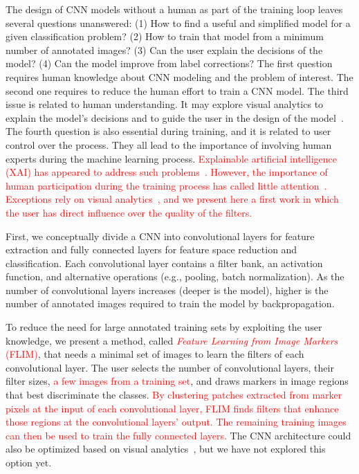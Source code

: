 \documentclass[journal, twoside]{IEEEtran}
\begin{document}
The design of CNN models without a human as part of the training loop leaves several questions unanswered: (1) How to find a useful and simplified model for a given classification problem? (2) How to train that model from a minimum number of annotated images?  (3) Can the user explain the decisions of the model? (4) Can the model improve from label corrections? The first question requires human knowledge about CNN modeling and the problem of interest. The second one requires to reduce the human effort to train a CNN model. The third issue is related to human understanding. It may explore visual analytics to explain the model's decisions and to guide the user in the design of the model~\cite{RauberInfoVis2018,GarciaIJCNN2019,SpinnerTVCG2020}. The fourth question is also essential during training, and it is related to user control over the process. They all lead to the importance of involving human experts during the machine learning process. \textcolor{red}{Explainable artificial intelligence (XAI) has appeared to address such problems~\cite{rauber2016visualizing,arrietaInfoFusion2020}. However, the importance of human participation during the training process has called little attention~\cite{AngelovNN2020}. Exceptions rely on visual analytics~\cite{RauberInfoVis2018,GarciaIJCNN2019,SpinnerTVCG2020}, and we present here a first work in which the user has direct influence over the quality of the filters.}

First, we conceptually divide a CNN into convolutional layers for feature extraction and fully connected layers for feature space reduction and classification. Each convolutional layer contains a filter bank, an activation function, and alternative operations (e.g., pooling, batch normalization).  As the number of convolutional layers increases (deeper is the model), higher is the number of annotated images required to train the model by backpropagation. 

To reduce the need for large annotated training sets by exploiting the user knowledge, we present a method, called \textcolor{red}{\emph{Feature Learning from Image Markers} (FLIM)}, that needs a minimal set of images to learn the filters of each convolutional layer. The user selects the number of convolutional layers, their filter sizes, \textcolor{red}{a few images from a training set}, and draws markers in image regions that best discriminate the classes. \textcolor{red}{By clustering patches extracted from marker pixels at the input of each convolutional layer, FLIM finds filters that enhance those regions at the convolutional layers' output. The remaining training images can then be used to train the fully connected layers.} The CNN architecture could also be optimized based on visual analytics~\cite{SpinnerTVCG2020}, but we have not explored this option yet.
\end{document}
